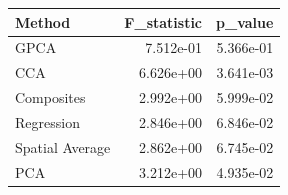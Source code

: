 \begin{tabular}{lrr}
\toprule
Method & F_statistic & p_value \\
\midrule
GPCA & 7.512e-01 & 5.366e-01 \\
CCA & 6.626e+00 & 3.641e-03 \\
Composites & 2.992e+00 & 5.999e-02 \\
Regression & 2.846e+00 & 6.846e-02 \\
Spatial Average & 2.862e+00 & 6.745e-02 \\
PCA & 3.212e+00 & 4.935e-02 \\
\bottomrule
\end{tabular}
